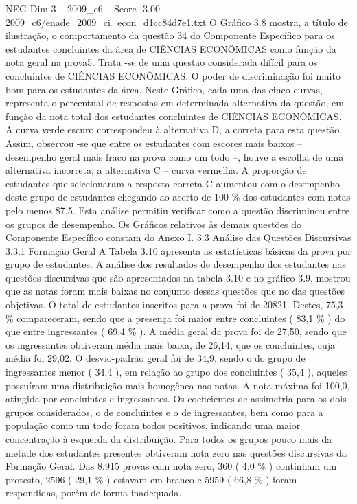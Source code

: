 \begin{textsample}{NEG Dim 3 – 2009\_c6 – Score -3.00 – 2009\_c6/enade\_2009\_ci\_econ\_d1cc84d7e1.txt}
O Gráfico 3.8 mostra, a título de ilustração, o comportamento da questão 34 do Componente Específico para os estudantes concluintes da área de CIÊNCIAS ECONÔMICAS como função da nota geral na prova5.
Trata -se de uma questão considerada difícil para os concluintes de CIÊNCIAS ECONÔMICAS.
O poder de discriminação foi muito bom para os estudantes da área.
Neste Gráfico, cada uma das cinco curvas, representa o percentual de respostas em determinada alternativa da questão, em função da nota total dos estudantes concluintes de CIÊNCIAS ECONÔMICAS.
A curva verde escuro correspondeu à alternativa D, a correta para esta questão.
Assim, observou -se que entre os estudantes com escores mais baixos – desempenho geral mais fraco na prova como um todo –, houve a escolha de uma alternativa incorreta, a alternativa C – curva vermelha.
A proporção de estudantes que selecionaram a resposta correta C aumentou com o desempenho deste grupo de estudantes chegando ao acerto de 100 \% dos estudantes com notas pelo menos 87,5.
Esta análise permitiu verificar como a questão discriminou entre os grupos de desempenho.
Os Gráficos relativos às demais questões do Componente Específico constam do Anexo I. 3.3 Análise das Questões Discursivas 3.3.1 Formação Geral A Tabela 3.10 apresenta as estatísticas básicas da prova por grupo de estudantes.
A análise dos resultados de desempenho dos estudantes nas questões discursivas que são apresentados na tabela 3.10 e no gráfico 3.9, mostrou que as notas foram mais baixas no conjunto dessas questões que no das questões objetivas.
O total de estudantes inscritos para a prova foi de 20821.
Destes, 75,3 \% compareceram, sendo que a presença foi maior entre concluintes ( 83,1 \% ) do que entre ingressantes ( 69,4 \% ).
A média geral da prova foi de 27,50, sendo que os ingressantes obtiveram média mais baixa, de 26,14, que os concluintes, cuja média foi 29,02.
O desvio-padrão geral foi de 34,9, sendo o do grupo de ingressantes menor ( 34,4 ), em relação ao grupo dos concluintes ( 35,4 ), aqueles possuíram uma distribuição mais homogênea nas notas.
A nota máxima foi 100,0, atingida por concluintes e ingressantes.
Os coeficientes de assimetria para os dois grupos considerados, o de concluintes e o de ingressantes, bem como para a população como um todo foram todos positivos, indicando uma maior concentração à esquerda da distribuição.
Para todos os grupos pouco mais da metade dos estudantes presentes obtiveram nota zero nas questões discursivas da Formação Geral.
Das 8.915 provas com nota zero, 360 ( 4,0 \% ) continham um protesto, 2596 ( 29,1 \% ) estavam em branco e 5959 ( 66,8 \% ) foram respondidas, porém de forma inadequada.

\end{textsample}
